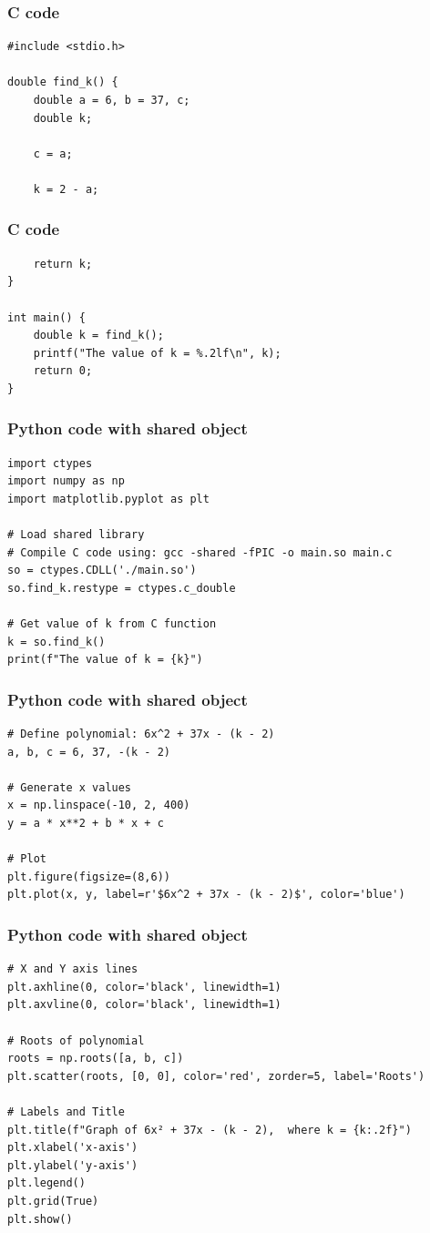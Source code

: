 \documentclass{beamer}
\begin{document}
\begin{frame}[fragile]
\frametitle{C code}
\begin{lstlisting}
#include <stdio.h>

double find_k() {
    double a = 6, b = 37, c; 
    double k;

    c = a;

    k = 2 - a;
    \end{lstlisting}
\end{frame}
\begin{frame}[fragile]
\frametitle{C code}
\begin{lstlisting}
    return k;
}

int main() {
    double k = find_k();
    printf("The value of k = %.2lf\n", k);
    return 0;
}
\end{lstlisting}
\end{frame}
\begin{frame}[fragile]
\frametitle{Python code with shared object}
\begin{lstlisting}
import ctypes
import numpy as np
import matplotlib.pyplot as plt

# Load shared library
# Compile C code using: gcc -shared -fPIC -o main.so main.c
so = ctypes.CDLL('./main.so')
so.find_k.restype = ctypes.c_double

# Get value of k from C function
k = so.find_k()
print(f"The value of k = {k}")
\end{lstlisting}
\end{frame}
\begin{frame}[fragile]
\frametitle{Python code with shared object}
\begin{lstlisting}
# Define polynomial: 6x^2 + 37x - (k - 2)
a, b, c = 6, 37, -(k - 2)

# Generate x values
x = np.linspace(-10, 2, 400)
y = a * x**2 + b * x + c

# Plot
plt.figure(figsize=(8,6))
plt.plot(x, y, label=r'$6x^2 + 37x - (k - 2)$', color='blue')
\end{lstlisting}
\end{frame}
\begin{frame}[fragile]
\frametitle{Python code with shared object}
\begin{lstlisting}
# X and Y axis lines
plt.axhline(0, color='black', linewidth=1)
plt.axvline(0, color='black', linewidth=1)

# Roots of polynomial
roots = np.roots([a, b, c])
plt.scatter(roots, [0, 0], color='red', zorder=5, label='Roots')

# Labels and Title
plt.title(f"Graph of 6x² + 37x - (k - 2),  where k = {k:.2f}")
plt.xlabel('x-axis')
plt.ylabel('y-axis')
plt.legend()
plt.grid(True)
plt.show()
\end{lstlisting}
\end{frame}
\end{document}
